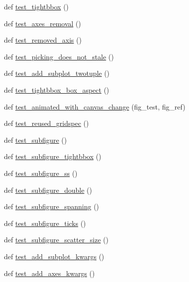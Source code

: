 \begin{DoxyCompactItemize}
\item 
def \hyperlink{namespacematplotlib_1_1tests_1_1test__figure_a94b870045f6eb12af644e020a2a7b970}{test\+\_\+tightbbox} ()
\item 
def \hyperlink{namespacematplotlib_1_1tests_1_1test__figure_ade1ec9a3bed7659face0e1bb18d26f8d}{test\+\_\+axes\+\_\+removal} ()
\item 
def \hyperlink{namespacematplotlib_1_1tests_1_1test__figure_a110b7c88a64e45b0e2ba3a16246c9c29}{test\+\_\+removed\+\_\+axis} ()
\item 
def \hyperlink{namespacematplotlib_1_1tests_1_1test__figure_a36056b2d2199ca8092e7761d47d2bc90}{test\+\_\+picking\+\_\+does\+\_\+not\+\_\+stale} ()
\item 
def \hyperlink{namespacematplotlib_1_1tests_1_1test__figure_a4f7f0fa91d74a6f85c0dd8b003f682d3}{test\+\_\+add\+\_\+subplot\+\_\+twotuple} ()
\item 
def \hyperlink{namespacematplotlib_1_1tests_1_1test__figure_a6fdd93c560354543bca4d99122fa41c3}{test\+\_\+tightbbox\+\_\+box\+\_\+aspect} ()
\item 
def \hyperlink{namespacematplotlib_1_1tests_1_1test__figure_ad9dffe800a59649430fd761a6118f77e}{test\+\_\+animated\+\_\+with\+\_\+canvas\+\_\+change} (fig\+\_\+test, fig\+\_\+ref)
\item 
def \hyperlink{namespacematplotlib_1_1tests_1_1test__figure_ac2ab0ab9bb1c6771fdb928007d08135c}{test\+\_\+reused\+\_\+gridspec} ()
\item 
def \hyperlink{namespacematplotlib_1_1tests_1_1test__figure_ab5c88b0bc142d7d4f42491d3c4f70dad}{test\+\_\+subfigure} ()
\item 
def \hyperlink{namespacematplotlib_1_1tests_1_1test__figure_a7b42ce07287cfac5f3fce57f89237562}{test\+\_\+subfigure\+\_\+tightbbox} ()
\item 
def \hyperlink{namespacematplotlib_1_1tests_1_1test__figure_ad3384fa4c20813f65c51775c667b0386}{test\+\_\+subfigure\+\_\+ss} ()
\item 
def \hyperlink{namespacematplotlib_1_1tests_1_1test__figure_ad155b12fd509d9224e61b217c8eb2f26}{test\+\_\+subfigure\+\_\+double} ()
\item 
def \hyperlink{namespacematplotlib_1_1tests_1_1test__figure_a78edb2ada031199f1ccb9571111343a0}{test\+\_\+subfigure\+\_\+spanning} ()
\item 
def \hyperlink{namespacematplotlib_1_1tests_1_1test__figure_acfe0ad149192fe507c70275dae2012b1}{test\+\_\+subfigure\+\_\+ticks} ()
\item 
def \hyperlink{namespacematplotlib_1_1tests_1_1test__figure_acf0727f47b552b465dabadabfcf3d15a}{test\+\_\+subfigure\+\_\+scatter\+\_\+size} ()
\item 
def \hyperlink{namespacematplotlib_1_1tests_1_1test__figure_a5c3ec8f4c6711b14ee0f5b6b9a6ccd52}{test\+\_\+add\+\_\+subplot\+\_\+kwargs} ()
\item 
def \hyperlink{namespacematplotlib_1_1tests_1_1test__figure_af9dadb5b3f90b3804c466b0ffe5b49c5}{test\+\_\+add\+\_\+axes\+\_\+kwargs} ()
\end{DoxyCompactItemize}
